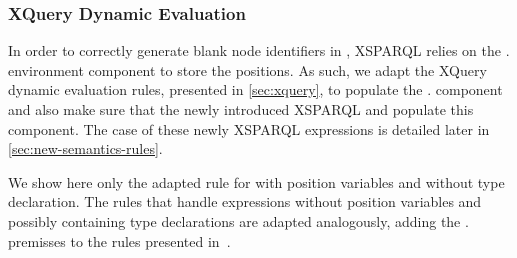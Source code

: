 \subsubsection{XQuery \FOR Dynamic Evaluation}
\label{sec:norm-for}
%
In order to correctly generate blank node identifiers in , XSPARQL relies on the
\dyn. environment component to store the positions.
%
As such, we adapt the XQuery \FOR dynamic evaluation rules, presented in \cref{sec:xquery}, to populate the
\dyn. component and also make sure that the newly introduced XSPARQL  and
 populate this component.  The case of these newly XSPARQL expressions is detailed later in
\cref{sec:new-semantics-rules}.


We show here only the adapted rule for  with position variables and without type declaration.  The rules
that handle \FOR expressions without position variables and possibly containing type declarations are adapted
analogously, adding the \dyn. premisses to the rules presented
in~\citet[Section~4.8.2]{DraperFankhauserFernandez:2010aa}.
%

